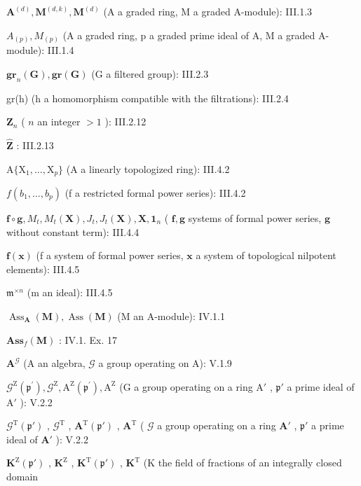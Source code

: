 \(\mathbf{A}^{(d)}, \mathbf{M}^{(d,k)}, \mathbf{M}^{(d)}\) (A a graded ring, M a graded A-module): III.1.3

\(A_{(p)}, M_{(p)}\) (A a graded ring, p a graded prime ideal of A, M a graded A-module): III.1.4

\(\mathbf{gr}_n(\mathbf{G}), \mathbf{gr}(\mathbf{G})\) (G a filtered group): III.2.3

gr(h) (h a homomorphism compatible with the filtrations): III.2.4

\(\mathbf{Z}_n\) ( \(n\) an integer \(>1\) ): III.2.12

\(\hat{\mathbf{Z}}\) : III.2.13

\(\mathrm{A}\{\mathrm{X}_1,\dots ,\mathrm{X}_p\}\) (A a linearly topologized ring): III.4.2

\(f(b_{1},\ldots ,b_{p})\) (f a restricted formal power series): III.4.2

\(\mathbf{f} \circ \mathbf{g}, M_{t}, M_{t}(\mathbf{X}), J_{t}, J_{t}(\mathbf{X}), \mathbf{X}, \mathbf{1}_{n}\) ( \(\mathbf{f}, \mathbf{g}\) systems of formal power series, \(\mathbf{g}\) without constant term): III.4.4

\(\mathbf{f}(\mathbf{x})\) (f a system of formal power series, \(\mathbf{x}\) a system of topological nilpotent elements): III.4.5

\(\mathfrak{m}^{\times n}\) (m an ideal): III.4.5

\(\operatorname{Ass}_{\mathbf{A}}(\mathbf{M}), \operatorname{Ass}(\mathbf{M})\) (M an A-module): IV.1.1

\(\mathbf{Ass}_f(\mathbf{M})\) : IV.1. Ex. 17

\(\mathbf{A}^{\mathcal{G}}\) (A an algebra, \(\mathcal{G}\) a group operating on A): V.1.9

\(\mathcal{G}^{\mathrm{Z}}(\mathfrak{p}^{\prime}), \mathcal{G}^{\mathrm{Z}}, \mathrm{A}^{\mathrm{Z}}(\mathfrak{p}^{\prime}), \mathrm{A}^{\mathrm{Z}}\) (G a group operating on a ring \(\mathrm{A}'\) , \(\mathfrak{p}'\) a prime ideal of \(\mathrm{A}'\) ): V.2.2

\(\mathcal{G}^{\mathrm{T}}(\mathfrak{p}')\) , \(\mathcal{G}^{\mathrm{T}}\) , \(\mathbf{A}^{\mathrm{T}}(\mathfrak{p}')\) , \(\mathbf{A}^{\mathrm{T}}\) ( \(\mathcal{G}\) a group operating on a ring \(\mathbf{A}'\) , \(\mathfrak{p}'\) a prime ideal of \(\mathbf{A}'\) ): V.2.2

\(\mathbf{K}^{\mathrm{Z}}(\mathfrak{p}')\) , \(\mathbf{K}^{\mathrm{Z}}\) , \(\mathbf{K}^{\mathrm{T}}(\mathfrak{p}')\) , \(\mathbf{K}^{\mathrm{T}}\) (K the field of fractions of an integrally closed domain

